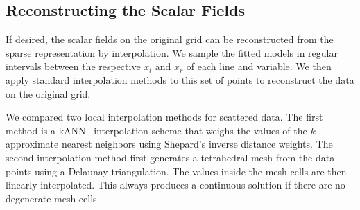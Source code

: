 
\subsection{Reconstructing the Scalar Fields} %
\label{sec:reconstruction}
%
If desired, the scalar fields on the original grid can be reconstructed from the
sparse representation by interpolation. We sample the fitted models in regular
intervals between the respective $x_l$ and $x_r$ of each line and variable. We
then apply standard interpolation methods to this set of points to reconstruct
the data on the original grid.

%

We compared two local interpolation methods for scattered data. The first method
is a \ac{kANN}~\cite{Arya1998} interpolation
scheme that weighs the values of the $k$ approximate nearest neighbors using
Shepard's inverse distance weights. 
%
%
%
The second interpolation method first generates a tetrahedral mesh from the data
points using a Delaunay triangulation. The values inside the mesh cells are then
linearly interpolated. This always produces a continuous solution if there are
no degenerate mesh cells.

